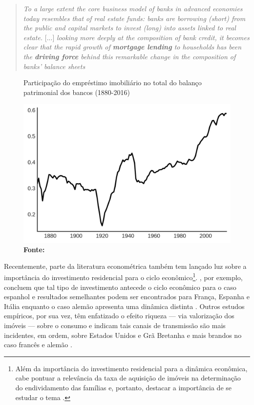 \begin{quote}
	\textit{To a large extent the core business model of banks in advanced economies today resembles that of real estate funds: banks are borrowing (short) from the public and capital markets to invest (long) into assets linked to real estate.} [...] \textit{looking more deeply at the composition of bank credit, it becomes clear that the rapid growth of \textbf{mortgage lending} to households has been the \textbf{driving force} behind this remarkable change in the composition of banks’ balance sheets} \cite[p.~2, grifos adicionados]{jorda_great_2014}
\end{quote}

\begin{figure}
	\centering
	\caption{Participação do empréstimo imobiliário no total do balanço patrimonial dos bancos (1880-2016)}
	\label{GraficoJorda}
	\includegraphics[width=.7\textwidth]{Jorda_Mean.png}
	\caption*{\textbf{Fonte:} \textcite[p.~10]{jorda_great_2014}}
\end{figure}


Recentemente, parte da literatura econométrica também tem lançado luz sobre a importância do investimento residencial para o ciclo econômico\footnote{Além da importância do investimento residencial para a dinâmica econômica, cabe pontuar a relevância da taxa de aquisição de imóveis na determinação do endividamento das famílias e, portanto, destacar a importância de se estudar o tema \cite{schwartz_politics_2009}.
}. \textcite{alvarez_does_2010}, por exemplo, concluem que tal tipo de investimento antecede o ciclo econômico para o caso espanhol e resultados semelhantes podem ser encontrados para França, Espanha  e Itália enquanto o caso alemão apresenta uma dinâmica distinta \cites{ferrara_cyclical_2010}{ferrara_common_2010}. 
Outros estudos empíricos, por sua vez, têm enfatizado o efeito riqueza --- via valorização dos imóveis --- sobre o consumo e indicam tais canais de transmissão são mais incidentes, em ordem, sobre Estados Unidos e Grã Bretanha e mais brandos no caso francês e alemão \cites{sastre_assessment_2010}{chauvin_wealth_2010}{bassanetti_effects_2010}{arrondel_housing_2010}.

